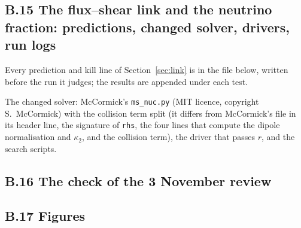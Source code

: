 \documentclass[11pt]{article}
\begin{document}
\subsection*{B.15 The flux--shear link and the neutrino fraction: predictions, changed solver, drivers, run logs}
Every prediction and kill line of Section~\ref{sec:link} is in the file below, written before the run it judges; the results are appended under each test.

The changed solver: McCormick's \texttt{ms\_nuc.py} (MIT licence, copyright S.~McCormick) with the collision term split (it differs from McCormick's file in its header line, the signature of \texttt{rhs}, the four lines that compute the dipole normalisation and $\kappa_2$, and the collision term), the driver that passes $r$, and the search scripts.






















\subsection*{B.16 The check of the 3 November review}



\subsection*{B.17 Figures}





\end{document}
